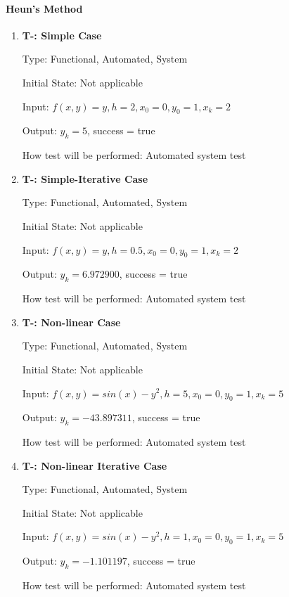 \documentclass[12pt, titlepage]{article}
\newcounter{tnum} %
\begin{document}
\paragraph{Heun's Method}
\begin{enumerate}

\item{\textbf{T-\thetnum \label{t-heun_simple}: Simple Case}}

Type: Functional, Automated, System %
					
Initial State: Not applicable
					
Input: $f(x, y) = y, h = 2, x_0 = 0, y_0 = 1, x_k = 2$
					
Output: $y_k = 5$, success = true
					
How test will be performed: Automated system test

\item{\textbf{T-\thetnum \label{t-heun_simpleiterative}: Simple-Iterative Case}}

Type: Functional, Automated, System %
					
Initial State: Not applicable
					
Input: $f(x, y) = y, h = 0.5, x_0 = 0, y_0 = 1, x_k = 2$
					
Output: $y_k = 6.972900$, success = true
					
How test will be performed: Automated system test

\item{\textbf{T-\thetnum \label{t-heun_nonlinear}: Non-linear Case}}

Type: Functional, Automated, System %
					
Initial State: Not applicable
					
Input: $f(x, y) = sin(x) - y^2, h = 5, x_0 = 0, y_0 = 1, x_k = 5$
					
Output: $y_k = -43.897311$, success = true
					
How test will be performed: Automated system test

\item{\textbf{T-\thetnum \label{t-heun_nonlineariterative}: Non-linear Iterative Case}}

Type: Functional, Automated, System %
					
Initial State: Not applicable
					
Input: $f(x, y) = sin(x) - y^2, h = 1, x_0 = 0, y_0 = 1, x_k = 5$
					
Output: $y_k = -1.101197$, success = true
					
How test will be performed: Automated system test

\end{enumerate}
\end{document}
